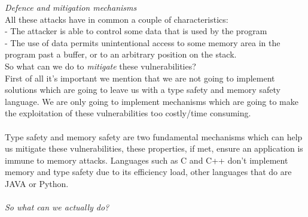 \documentclass[11pt, oneside]{article}   	%
\begin{document}
\emph{Defence and mitigation mechanisms}\\
All these attacks have in common a couple of characteristics:\\
- The attacker is able to control some data that is used by the program\\
- The use of data permits unintentional access to some memory area in the program past a buffer, or to an arbitrary position on the stack.\\
So what can we do to \emph{mitigate} these vulnerabilities?\\
First of all it's important we mention that we are not going to implement solutions which are going to leave us with a type safety and memory safety language. We are only going to implement mechanisms which are going to make the exploitation of these vulnerabilities too costly/time consuming.\\\\
Type safety and memory safety are two fundamental mechanisms which can help us mitigate these vulnerabilities, these properties, if met, ensure an application is immune to memory attacks. Languages such as C and C++ don't implement memory and type safety due to its efficiency load, other languages that do are JAVA or Python.\\\\
\emph{So what can we actually do?}
\end{document}
